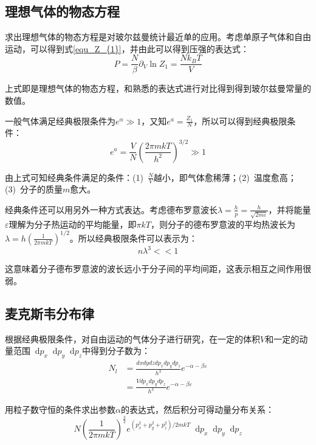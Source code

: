 \documentclass[UTF8]{ctexart}
\newcommand*{\dif}{\mathop{}\!\mathrm{d}}
\begin{document}
	\subsection{理想气体的物态方程}
	求出理想气体的物态方程是对玻尔兹曼统计最近单的应用。考虑单原子气体和自由运动，可以得到式\ref{equ_Z_{1}}，并由此可以得到压强的表达式：
	\begin{equation}
	P=\frac{N}{\beta} \partial_{V} \ln Z_{1}=\frac{N k_{B} T}{V}
	\end{equation}
	
\noindent 上式即是理想气体的物态方程，和熟悉的表达式进行对比得到得到玻尔兹曼常量的数值。

	一般气体满足经典极限条件为$ e^{\alpha} \gg 1 $，又知$ e^{a}=\frac{Z_{1}}{N} $，所以可以得到经典极限条件：
	\begin{equation}
		e^{a}=\frac{V}{N}\left(\frac{2 \pi m k T}{h^{2}}\right)^{3/2} \gg 1
	\end{equation}
	
\noindent 由上式可知经典条件满足的条件：(1)\ $\frac{N}{V}$越小，即气体愈稀薄；(2)\ 温度愈高；(3)\ 分子的质量$ m $愈大。

	经典条件还可以用另外一种方式表达。考虑德布罗意波长$ \lambda =\frac{h}{p}=\frac{h}{\sqrt{2 m \varepsilon}} $，并将能量$ \varepsilon $理解为分子热运动的平均能量，即$ \pi k T $，则分子的德布罗意波的平均热波长为$ \lambda = h\left(\frac{1}{2 \pi m k T}\right)^{1/2} $。所以经典极限条件可以表示为：
	\begin{equation}
		n \lambda^{3}<<1
	\end{equation}
	
\noindent 这意味着分子德布罗意波的波长远小于分子间的平均间距，这表示相互之间作用很弱。

	\subsection{麦克斯韦分布律}
	根据经典极限条件，对自由运动的气体分子进行研究，在一定的体积$ V $和一定的动量范围$ \dif p_{x} \dif p_{y} \dif p_{z} $中得到分子数为：
	\begin{equation}
	\begin{aligned}
	N_{l}&=\frac{d x d y d z d p_{x} d p_{y} d p_{z}}{h^{3}} e^{-\alpha-\beta \varepsilon}\\
			&=\frac{V d p_{x} d p_{y} d p_{z}}{h^{3}} e^{-\alpha-\beta \varepsilon}
	\end{aligned}
	\end{equation}
	
	用粒子数守恒的条件求出参数$ \alpha $的表达式，然后积分可得动量分布关系：
	\begin{equation}
		N \left(\frac{1}{2 \pi m k T}\right)^{\frac{3}{2}} e^{\left(p_{x}^{2}+p_{y}^{2}+p_{z}^{2}\right)/2 m k T} \dif p_{x} \dif p_{y} \dif p_{z}
	\end{equation}
	
\end{document}

